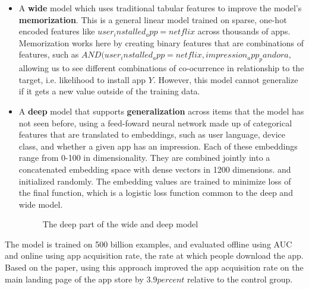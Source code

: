 \documentclass[11pt, table]{diazessay} %
\begin{document}
\begin{sloppypar}
\begin{itemize}
  \item A \textbf{wide} model which uses traditional tabular features to improve the model's \textbf{memorization}. This is a general linear model trained on sparse, one-hot encoded features like $user_installed_app=netflix$ across thousands of apps. Memorization works here by creating binary features that are combinations of features, such as $AND(user_installed_app=netflix, impression_app_pandora$, allowing us to see different combinations of co-ocurrence in relationship to the target, i.e. likelihood to install app $Y$. However, this model cannot generalize if it gets a new value outside of the training data. 
  \item A \textbf{deep} model that supports \textbf{generalization} across items that the model has not seen before, using a feed-foward neural network made up of categorical features that are translated to embeddings, such as user language, device class, and whether a given app has an impression. Each of these embeddings range from 0-100 in dimensionality. They are combined jointly into a concatenated embedding space with dense vectors in 1200 dimensions.  and initialized randomly. The embedding values are trained to minimize loss of the final function, which is a logistic loss function common to the deep and wide model.  
\begin{figure}[H]
\caption{The deep part of the wide and deep model\citep{cheng2016wide}}
\end{figure}
\end{itemize}

The model is trained on 500 billion examples, and evaluated offline using AUC and online using app acquisition rate, the rate at which people download the app. Based on the paper, using this approach improved the app acquisition rate on the main landing page of the app store by $3.9 percent$ relative to the control group.



\end{sloppypar}
\end{document}
